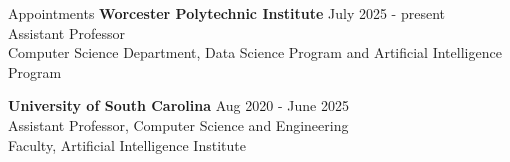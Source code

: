 \begin{rSection}{Appointments}
{\bf Worcester Polytechnic Institute
} \hfill {July 2025 - present} \\
{
Assistant Professor\\
Computer Science Department, Data Science Program and Artificial Intelligence Program
} 

{\bf University of South Carolina} \hfill {Aug 2020 - June 2025} \\
{
Assistant Professor, Computer Science and Engineering\\
Faculty, Artificial Intelligence Institute
} 


\end{rSection}
